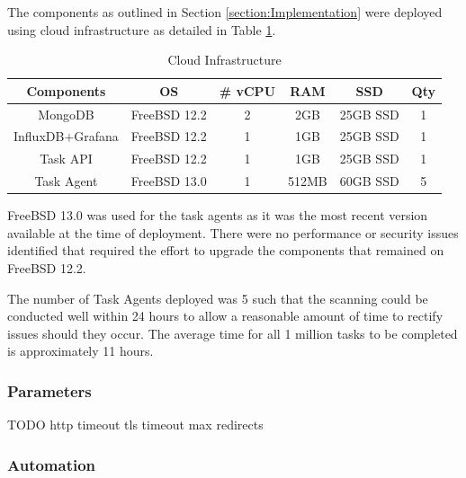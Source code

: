 \documentclass{mscreport}
\begin{document}
The components as outlined in Section \ref{section:Implementation} were deployed using cloud infrastructure as detailed in Table \ref{table:implmentation_cloud}.

\begin{table}[H]
  \begin{center}
    \begin{tabular}{|c|c|c|c|c|c|}  %
      \hline
      \textbf{Components} & \textbf{OS} & \textbf{\# vCPU} & \textbf{RAM} & \textbf{SSD} & \textbf{Qty}\\
      \hline
      MongoDB & FreeBSD 12.2 & 2 & 2GB & 25GB SSD & 1 \\
      \hline
      InfluxDB$+$Grafana & FreeBSD 12.2 & 1 & 1GB & 25GB SSD & 1 \\
      \hline
      Task API & FreeBSD 12.2 & 1 & 1GB & 25GB SSD & 1 \\
      \hline
      Task Agent & FreeBSD 13.0 & 1 & 512MB & 60GB SSD & 5 \\
      \hline
    \end{tabular}
    \caption{Cloud Infrastructure}
    \label{table:implmentation_cloud} %
  \end{center}
\end{table}

\vspace{0.3cm} \noindent
FreeBSD 13.0 was used for the task agents as it was the most recent version available at the time of deployment. There were no performance or security issues identified that required the effort to upgrade the components that remained on FreeBSD 12.2.

\vspace{0.3cm} \noindent
The number of Task Agents deployed was 5 such that the scanning could be conducted well within 24 hours to allow a reasonable amount of time to rectify issues should they occur. The average time for all 1 million tasks to be completed is approximately 11 hours.

\subsubsection{Parameters}

TODO
http timeout
tls timeout
max redirects

\subsubsection{Automation}
\end{document}
